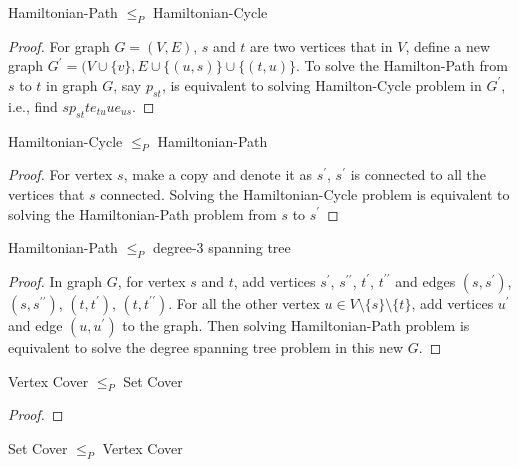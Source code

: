 
			\begin{lemma}
				Hamiltonian-Path $\le_P$ Hamiltonian-Cycle
			\end{lemma}
			\begin{proof}
				For graph $G = (V, E)$, $s$ and $t$ are two vertices that in $V$, define a new graph $G^\prime = (V \cup \{v\}, E \cup \{(u, s)\} \cup \{(t, u)\}$. To solve the Hamilton-Path from $s$ to $t$ in graph $G$, say $p_{st}$, is equivalent to solving Hamilton-Cycle problem in $G^\prime$, i.e., find $sp_{st}te_{tu}ue_{us}$.
			\end{proof}

			\begin{lemma}
				Hamiltonian-Cycle $\le_P$ Hamiltonian-Path
			\end{lemma}

			\begin{proof}
				For vertex $s$, make a copy and denote it as $s^\prime$, $s^\prime$ is connected to all the vertices that $s$ connected. Solving the Hamiltonian-Cycle problem is equivalent to solving the Hamiltonian-Path problem from $s$ to $s^\prime$
			\end{proof}

			\begin{lemma}
				Hamiltonian-Path $\le_P$ degree-3 spanning tree
			\end{lemma}

			\begin{proof}
				In graph $G$, for vertex $s$ and $t$, add vertices $s^\prime$, $s^{\prime\prime}$, $t^\prime$, $t^{\prime\prime}$ and edges $(s, s^\prime)$, $(s, s^{\prime\prime})$, $(t, t^\prime)$, $(t, t^{\prime\prime})$. For all the other vertex $u \in V\setminus \{s\} \setminus \{t\}$, add vertices $u^\prime$ and edge $(u, u^\prime)$ to the graph. Then solving Hamiltonian-Path problem is equivalent to solve the degree spanning tree problem in this new $G$.
			\end{proof}

			\begin{lemma}
				Vertex Cover $\le_P$ Set Cover
			\end{lemma}

			\begin{proof}
				
			\end{proof}

			\begin{lemma}
				Set Cover $\le_P$ Vertex Cover
			\end{lemma}


